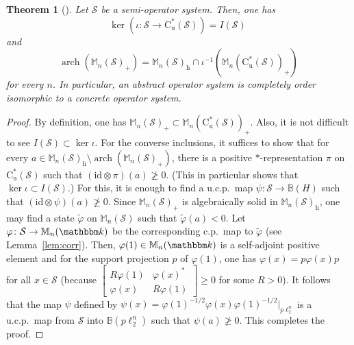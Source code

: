 \documentclass[12pt]{amsart}
\newtheorem{thm}{Theorem}
\theoremstyle{definition}
\begin{document}
\begin{thm}[\cite{ce}]\label{thm:ce}
Let ${{\mathcal S}}$ be a semi-operator system.
Then, one has
\[
\ker(\iota\colon {{\mathcal S}}\to\mathrm{C}^*_{\mathrm{u}}({{\mathcal S}}))=I({{\mathcal S}})\
\]
and
\[
\operatorname*{arch}({{\mathbb M}}_n({{\mathcal S}})_+) = {{\mathbb M}}_n({{\mathcal S}})_{\mathrm{h}} \cap \iota^{-1}({{\mathbb M}}_n(\mathrm{C}^*_{\mathrm{u}}({{\mathcal S}}))_+)
\]
for every $n$.
In particular, an abstract operator system is completely order isomorphic to
a concrete operator system.
\end{thm}

\begin{proof}
By definition, one has ${{\mathbb M}}_n({{\mathcal S}})_+\subset{{\mathbb M}}_n(\mathrm{C}^*_{\mathrm{u}}({{\mathcal S}}))_+$.
Also, it is not difficult to see $I({{\mathcal S}})\subset\ker\iota$.
For the converse inclusions, it suffices to show that
for every $a\in{{\mathbb M}}_n({{\mathcal S}})_{\mathrm{h}}\setminus\operatorname*{arch}({{\mathbb M}}_n({{\mathcal S}})_+)$,
there is a positive {$*$-repre\-sen\-ta\-tion\xspace} $\pi$ on $\mathrm{C}^*_{\mathrm{u}}({{\mathcal S}})$ such that
$({\mathrm{id}}\otimes\pi)(a)\not\geq0$. (This in particular shows that $\ker\iota\subset I({{\mathcal S}})$.)
For this, it is enough to find a u.c.p.\ map $\psi\colon{{\mathcal S}}\to{{\mathbb B}}({H})$ such that
$({\mathrm{id}}\otimes\psi)(a)\not\geq0$.
Since ${{\mathbb M}}_n({{\mathcal S}})_+$ is algebraically solid in ${{\mathbb M}}_n({{\mathcal S}})_{\mathrm{h}}$,
one may find a state $\tilde{\varphi}$ on ${{\mathbb M}}_n({{\mathcal S}})$ such that
$\tilde{\varphi}(a)<0$. Let ${\varphi}\colon{{\mathcal S}}\to{{\mathbb M}}_n({{\mathbbm k}})$ be
the corresponding c.p.\ map to $\tilde{\varphi}$ (see Lemma~\ref{lem:corr}).
Then, ${\varphi}(1)\in{{\mathbb M}}_n({{\mathbbm k}})$ is a self-adjoint positive element and
for the support projection $p$ of ${\varphi}(1)$, one has ${\varphi}(x)=p{\varphi}(x)p$ for all $x\in{{\mathcal S}}$
(because $\left[\begin{smallmatrix} R{\varphi}(1) & {\varphi}(x)^* \\ {\varphi}(x) & R{\varphi}(1)\end{smallmatrix}\right]\geq0$
for some $R>0$).
It follows that the map $\psi$ defined by $\psi(x)={\varphi}(1)^{-1/2}{\varphi}(x){\varphi}(1)^{-1/2}|_{p\ell_2^n}$
is a u.c.p.\ map from ${{\mathcal S}}$ into ${{\mathbb B}}(p\ell_2^n)$ such that $\psi(a)\not\geq0$.
This completes the proof.
\end{proof}
\end{document}
